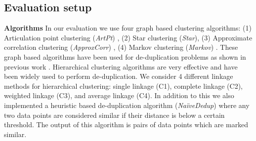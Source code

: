 \documentclass[12pt]{article}
\begin{document}
\subsection{Evaluation setup}
\label{sec:setup}
\textbf{Algorithms} In our evaluation we use four graph based clustering algorithms: (1) Articulation point clustering (\textit{ArtPt}) \cite{cormen2009introduction}, (2) \cite{aslam2006star} Star clustering (\textit{Star}), (3) Approximate correlation clustering (\textit{ApproxCorr}) \cite{bansal2004correlation}, (4) Markov clustering (\textit{Markov}) \cite{van2000graph}. These graph based algorithms have been used for de-duplication problems as shown in previous work \cite{hassanzadeh2009framework}.
Hierarchical clustering algorithms are very effective and have been widely used to perform de-duplication. We consider 4 different linkage methods for hierarchical clustering: single linkage (C1), complete linkage (C2), weighted linkage (C3), and average linkage (C4). 
In addition to this we also implemented a heuristic based de-duplication algorithm (\textit{Na\"iveDedup}) where any two data points are considered similar if their distance is below a certain threshold. The output of this algorithm is pairs of data points which are marked similar.
\end{document}
